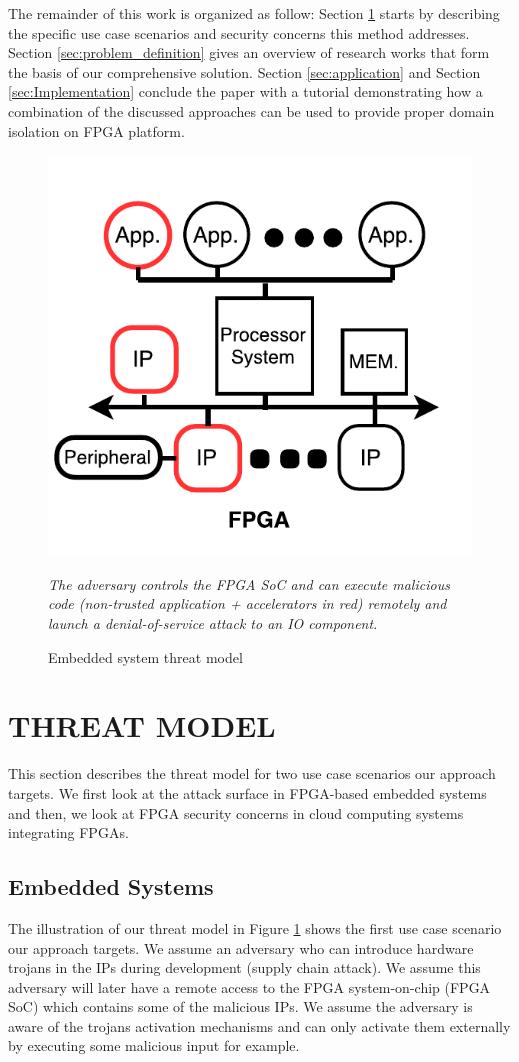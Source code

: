 \documentclass[sigconf]{acmart}
\theoremstyle{plain}
\theoremstyle{remark}
\begin{document}
The remainder of this work is organized as follow: Section \ref{sec:threat_model} starts by describing the specific use case scenarios and security concerns this method addresses. Section \ref{sec:problem_definition} gives an overview of research works that form the basis of our comprehensive solution. Section \ref{sec:application} and Section \ref{sec:Implementation} conclude the paper with a tutorial demonstrating how a combination of the discussed approaches can be used to provide proper domain isolation on FPGA platform.

\begin{figure}[h]
\centering
\includegraphics[width=0.5\columnwidth]{figures/ThreatModel.pdf}
\caption{Embedded system threat model}
\textit{The adversary controls the FPGA SoC and can execute malicious code (non-trusted application + accelerators in red) remotely and launch a denial-of-service attack to an IO component.}
\label{fig:threat}
\end{figure}

\section{THREAT MODEL} \label{sec:threat_model}

This section describes the threat model for two use case scenarios our approach targets. We first look at the attack surface in FPGA-based embedded systems and then, we look at FPGA security concerns in cloud computing systems integrating FPGAs.

\subsection{Embedded Systems}

The illustration of our threat model in Figure \ref{fig:threat} shows the first use case scenario our approach targets. We assume an adversary who can introduce hardware trojans in the IPs during development (supply chain attack). We assume this adversary will later have a remote access to the FPGA system-on-chip (FPGA SoC) which contains some of the malicious IPs. We assume the adversary is aware of the trojans activation mechanisms and can only activate them externally by executing some malicious input for example.
\end{document}
